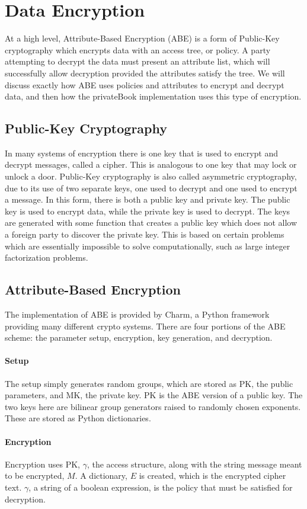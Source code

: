 \documentclass[12pt]{article}
\begin{document}
\section{Data Encryption}
At a high level, Attribute-Based Encryption (ABE) is a form of Public-Key cryptography which encrypts data with an access tree, or policy. A party attempting to decrypt the data must present an attribute list, which will successfully allow decryption provided the attributes satisfy the tree. We will discuss exactly how ABE uses policies and attributes to encrypt and decrypt data, and then how the privateBook implementation uses this type of encryption.

\subsection{Public-Key Cryptography}
In many systems of encryption there is one key that is used to encrypt and decrypt messages, called a cipher. This is analogous to one key that may lock or unlock a door. Public-Key cryptography is also called asymmetric cryptography, due to its use of two separate keys, one used to decrypt and one used to encrypt a message. In this form, there is both a public key and private key. The public key is used to encrypt data, while the private key is used to decrypt. The keys are generated with some function that creates a public key which does not allow a foreign party to discover the private key. This is based on certain problems which are essentially impossible to solve computationally, such as large integer factorization problems. 

\subsection{Attribute-Based Encryption}
The implementation of ABE is provided by Charm, a Python framework providing many different crypto systems. There are four portions of the ABE scheme: the parameter setup, encryption, key generation, and decryption. 
\paragraph{Setup}
The setup simply generates random groups, which are stored as PK, the public parameters, and MK, the private key. PK is the ABE version of a public key. The two keys here are bilinear group generators raised to randomly chosen exponents. These are stored as Python dictionaries.
\paragraph{Encryption}
Encryption uses PK, $\gamma$, the access structure, along with the string message meant to be encrypted, $M$. A dictionary, $E$ is created, which is the encrypted cipher text. $\gamma$, a string of a boolean expression, is the policy that must be satisfied for decryption.
\end{document}
